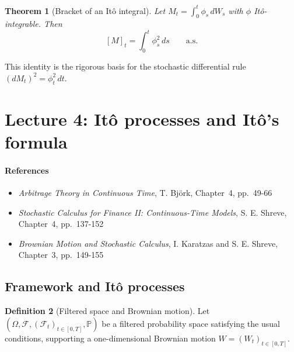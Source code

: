 \documentclass[11pt]{article}
\newcommand{\F}{\mathcal{F}}
\newcommand{\Pbb}{\mathbb{P}}
\newcommand{\1}{\mathbf{1}}
\theoremstyle{plain}
\newtheorem{theorem}{Theorem}[section]
\theoremstyle{definition}
\newtheorem{definition}[theorem]{Definition}
\theoremstyle{remark}
\begin{document}
\begin{theorem}[Bracket of an Itô integral]
Let
\(
M_t=\int_0^t \phi_s\,dW_s
\)
with $\phi$ Itô-integrable. Then
\[
[M]_t = \int_0^t \phi_s^2\,ds
\qquad\text{a.s.}
\]
\end{theorem}

This identity is the rigorous basis for the stochastic differential rule
\(
(dM_t)^2 = \phi_t^2\,dt.
\)


\section{Lecture 4: It\^o processes and It\^o's formula}

\paragraph{References}

\begin{itemize}[leftmargin=1.4em]

\item \textit{Arbitrage Theory in Continuous Time}, T. Björk, Chapter~4, pp.~49-66

\item \textit{Stochastic Calculus for Finance II: Continuous-Time Models},  
S. E. Shreve, Chapter~4, pp.~137-152

\item \textit{Brownian Motion and Stochastic Calculus}, I. Karatzas and S. E. Shreve, Chapter~3, pp.~149-155

\end{itemize}

\subsection{Framework and It\^o processes}

\begin{definition}[Filtered space and Brownian motion]
Let $(\Omega,\F,(\F_t)_{t\in[0,T]},\Pbb)$ be a filtered probability space satisfying the usual conditions,
supporting a one-dimensional Brownian motion $W=(W_t)_{t\in[0,T]}$.
\end{definition}
\end{document}
